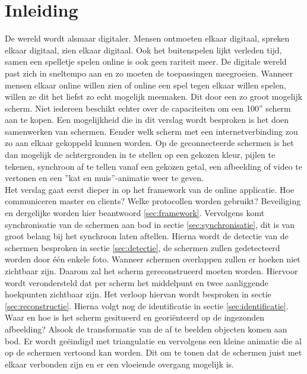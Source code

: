 \section{Inleiding}
De wereld wordt alsmaar digitaler. Mensen ontmoeten elkaar digitaal, spreken elkaar digitaal, zien elkaar digitaal. Ook het buitenspelen lijkt verleden tijd, samen een spelletje spelen online is ook geen rariteit meer. De digitale wereld past zich in sneltempo aan en zo moeten de toepassingen meegroeien. Wanneer mensen elkaar online willen zien of online een spel tegen elkaar willen spelen, willen ze dit het liefst zo echt mogelijk meemaken. Dit door een zo groot mogelijk scherm. Niet iedereen beschikt echter over de capaciteiten om een 100'' scherm aan te kopen. Een mogelijkheid die in dit verslag wordt besproken is het doen samenwerken van schermen. Eender welk scherm met een internetverbinding zou zo aan elkaar gekoppeld kunnen worden. Op de geconnecteerde schermen is het dan mogelijk de achtergronden in te stellen op een gekozen kleur, pijlen te tekenen, synchroon af te tellen vanaf een gekozen getal, een afbeelding of video te vertonen en een ''kat en muis''-animatie weer te geven.\\[3mm]
Het verslag gaat eerst dieper in op het framework van de online applicatie. Hoe communiceren master en clients? Welke  protocollen worden gebruikt? Beveiliging en dergelijke worden hier beantwoord \ref{sec:framework}. Vervolgens komt synchronisatie van de schermen aan bod in sectie \ref{sec:synchronisatie}, dit is van groot belang bij het synchroon laten aftellen. Hierna wordt de detectie van de schermen besproken in sectie \ref{sec:detectie}, de schermen zullen gedetecteerd worden door één enkele foto. Wanneer schermen overlappen zullen er hoeken niet zichtbaar zijn. Daarom zal het scherm gereconstrueerd moeten worden. Hiervoor wordt verondersteld dat per scherm het middelpunt en twee aanliggende hoekpunten zichtbaar zijn. Het verloop hiervan wordt besproken in sectie \ref{sec:reconstructie}. Hierna volgt nog de identificatie in sectie \ref{sec:identificatie}. Waar en hoe is het scherm gesitueerd en georiënteerd op de ingezonden afbeelding? Alsook de transformatie van de af te beelden objecten komen aan bod. Er wordt geëindigd met triangulatie en vervolgens een kleine animatie die al op de schermen vertoond kan worden. Dit om te tonen dat de schermen juist met elkaar verbonden zijn en er een vloeiende overgang mogelijk is. 